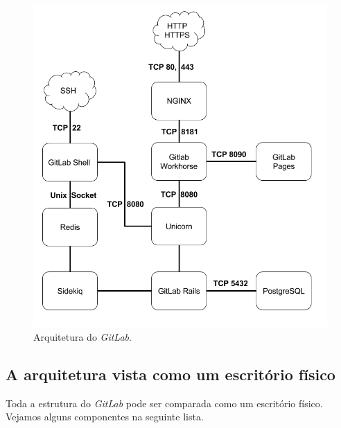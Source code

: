 \documentclass[12pt,a4paper]{article}
\begin{document}
\begin{figure}[H]
  \centering
  \includegraphics[scale=0.47]{images/gitlab_architecture_diagram.png}
  \caption{Arquitetura do \emph{GitLab}.}
\end{figure}

\newpage
\subsection{A arquitetura vista como um escritório físico}

Toda a estrutura do \emph{GitLab} pode ser comparada como um escritório físico. Vejamos alguns componentes na seguinte lista.
\end{document}
